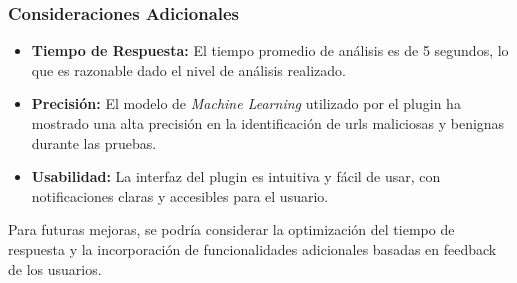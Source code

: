 \subsubsection*{Consideraciones Adicionales}
\begin{itemize}
    \item \textbf{Tiempo de Respuesta:} El tiempo promedio de análisis es de 5 segundos, lo que es razonable dado el nivel de análisis realizado.
    \item \textbf{Precisión:} El modelo de \textit{Machine Learning} utilizado por el plugin ha mostrado una alta precisión en la identificación de \glspl{url} maliciosas y benignas durante las pruebas.
    \item \textbf{Usabilidad:} La interfaz del plugin es intuitiva y fácil de usar, con notificaciones claras y accesibles para el usuario.
\end{itemize}

Para futuras mejoras, se podría considerar la optimización del tiempo de respuesta y la incorporación de funcionalidades adicionales basadas en feedback de los usuarios.
